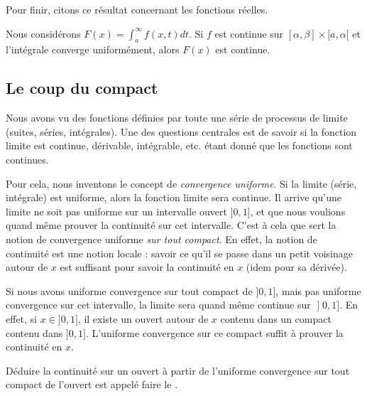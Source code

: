 Pour finir, citons ce résultat concernant les fonctions réelles.
\begin{theorem}     \label{ThoInDerrtCvUnifFContinue}
	Nous considérons \( F(x)=\int_a^{\infty}f(x,t)dt\). Si \( f\) est continue sur \( [\alpha,\beta]\times[a,\alpha[\) et l'intégrale converge uniformément, alors \( F(x)\) est continue.
\end{theorem}

\subsection{Le coup du compact}

\begin{normaltext}      \label{NORMooZWECooHvRgBw}

	Nous avons vu des fonctions définies par toute une série de processus de limite (suites, séries, intégrales). Une des questions centrales est de savoir si la fonction limite est continue, dérivable, intégrable, etc. étant donné que les fonctions sont continues.

	Pour cela, nous inventons le concept de \emph{convergence uniforme}. Si la limite (série, intégrale) est uniforme, alors la fonction limite sera continue. Il arrive qu'une limite ne soit pas uniforme sur un intervalle ouvert \( ]0,1]\), et que nous voulions quand même prouver la continuité sur cet intervalle. C'est à cela que sert la notion de convergence uniforme \emph{sur tout compact}. En effet, la notion de continuité est une notion locale : savoir ce qu'il se passe dans un petit voisinage autour de \( x\) est suffisant pour savoir la continuité en \( x\) (idem pour sa dérivée).

	Si nous avons uniforme convergence sur tout compact de \( ]0,1]\), mais pas uniforme convergence sur cet intervalle, la limite sera quand même continue sur \( \mathopen] 0 , 1 \mathclose]\). En effet, si \( x\in]0,1]\), il existe un ouvert autour de \( x\) contenu dans un compact contenu dans \( ]0,1]\). L'uniforme convergence sur ce compact suffit à prouver la continuité en \( x\).

	Déduire la continuité sur un ouvert à partir de l'uniforme convergence sur tout compact de l'ouvert est appelé faire le .
\end{normaltext}

